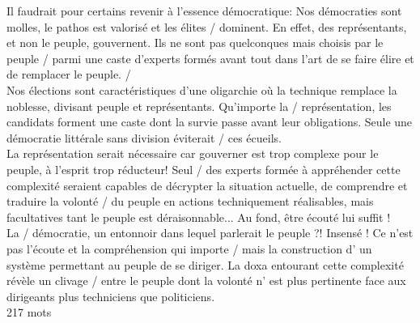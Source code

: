 \documentclass[a4paper, 12pt]{article}
\begin{document}
\pagestyle{fancy}

	Il faudrait pour certains revenir à l'essence démocratique: Nos démocraties sont molles, le pathos est valorisé  et les élites / dominent. En effet, des représentants, et non le peuple, gouvernent. Ils ne sont pas quelconques  mais choisis par le peuple / parmi une caste  d'experts  formés avant tout dans l'art de se faire élire et de remplacer le peuple. /\\

	Nos  élections sont caractéristiques d'une  oligarchie où la technique remplace la noblesse, divisant peuple et représentants. Qu'importe la / représentation, les candidats forment une caste  dont la  survie passe avant leur obligations. Seule une démocratie littérale sans division éviterait / ces écueils.\\

	La représentation serait nécessaire  car gouverner est trop complexe pour le  peuple, à l'esprit trop réducteur! Seul / des experts formée  à appréhender cette  complexité seraient capables de décrypter la situation actuelle,  de comprendre et traduire la volonté / du peuple en  actions techniquement réalisables,  mais facultatives tant le peuple est  déraisonnable... Au fond, être écouté lui suffit !\\

	La / démocratie, un entonnoir dans lequel  parlerait  le peuple ?! Insensé ! Ce n'est pas l'écoute et la compréhension qui importe  / mais la construction  d'  un système  permettant au peuple  de se diriger. La doxa entourant cette complexité révèle un clivage / entre le peuple  dont la volonté n'  est plus  pertinente face aux dirigeants plus techniciens que politiciens.\\

217 mots
\end{document}
